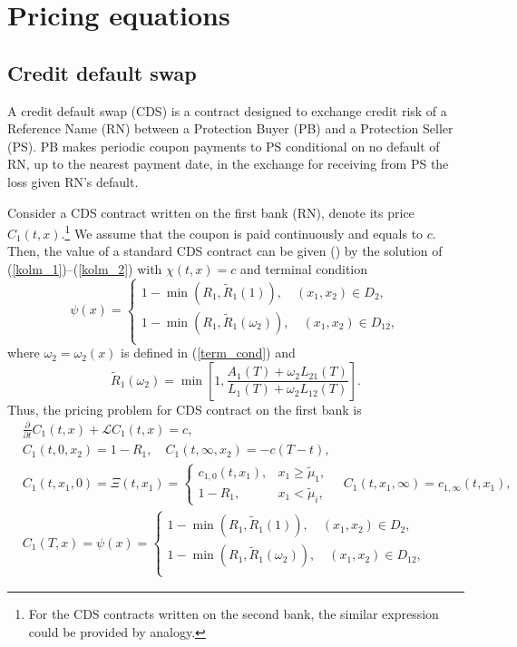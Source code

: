 \newpage
\appendix
\section{Pricing equations}
\subsection{Credit default swap}
\label{CDS_pricing}
A credit default swap (CDS) is a contract designed to exchange credit risk of a Reference Name (RN) between a Protection Buyer (PB) and a Protection Seller (PS). PB makes periodic coupon payments to PS conditional on no default of RN, up to the nearest payment date, in the exchange for receiving from PS the loss given RN's default.

Consider a CDS contract written on the first bank (RN), denote its price $C_1(t, x)$.\footnote{For the CDS contracts written on the second bank, the similar expression could be provided by analogy.} We assume that the coupon is paid continuously and equals to $c$. Then, the value of a standard CDS contract can be given (\cite{BieleckiRutkowski}) by the solution of  (\ref{kolm_1})--(\ref{kolm_2})  with $\chi(t, x) = c$ and terminal condition
\begin{equation*}
	\psi(x) = 
	\begin{cases}
		1 - \min(R_1, \tilde{R}_1(1)), \quad (x_1, x_2) \in D_2, \\
		1 - \min(R_1, \tilde{R}_1(\omega_2)), \quad (x_1, x_2) \in D_{12}, \\		
	\end{cases}
\end{equation*}
where $\omega_2 = \omega_2(x)$ is defined in (\ref{term_cond}) and 
\begin{equation*}
	\tilde{R}_1(\omega_2) = \min \left[1, \frac{A_1(T) +  \omega_2 L_{2 1}(T)}{L_1(T) + \omega_2 L_{12}(T)}\right].
\end{equation*}
Thus, the pricing problem for CDS contract on the first bank is
\begin{equation}
\begin{aligned}
		& \frac{\partial}{\partial t} C_1(t, x) + \mathcal{L} C_1(t, x) = c, \\
		& C_1(t, 0, x_2) = 1 - R_1, \quad C_1(t, \infty, x_2) = -c(T-t), \\
		& C_1(t, x_1, 0) = \Xi(t, x_1) = 
		\begin{cases}
			c_{1,0}(t, x_1), & x_1 \ge \tilde{\mu}_1, \\
			1-R_1, & x_1 < \tilde{\mu}_i,
		\end{cases} \quad C_1(t, x_1, \infty) = c_{1,\infty}(t, x_1),\\
		& C_1(T, x) = \psi(x) = 
	\begin{cases}
		1 - \min(R_1, \tilde{R}_1(1)), \quad (x_1, x_2) \in D_2, \\
		1 - \min(R_1, \tilde{R}_1(\omega_2)), \quad (x_1, x_2) \in D_{12}, \\		
	\end{cases}
\end{aligned}
\end{equation}
